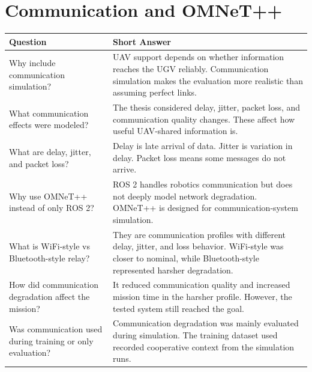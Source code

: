 \documentclass[11pt,a4paper]{article}
\begin{document}
\section*{Communication and OMNeT++}
\begin{longtable}{QA}
\toprule
\textbf{Question} & \textbf{Short Answer} \\
\midrule
\endhead
Why include communication simulation? &
UAV support depends on whether information reaches the UGV reliably. Communication simulation makes the evaluation more realistic than assuming perfect links. \\
\addlinespace
What communication effects were modeled? &
The thesis considered delay, jitter, packet loss, and communication quality changes. These affect how useful UAV-shared information is. \\
\addlinespace
What are delay, jitter, and packet loss? &
Delay is late arrival of data. Jitter is variation in delay. Packet loss means some messages do not arrive. \\
\addlinespace
Why use OMNeT++ instead of only ROS 2? &
ROS 2 handles robotics communication but does not deeply model network degradation. OMNeT++ is designed for communication-system simulation. \\
\addlinespace
What is WiFi-style vs Bluetooth-style relay? &
They are communication profiles with different delay, jitter, and loss behavior. WiFi-style was closer to nominal, while Bluetooth-style represented harsher degradation. \\
\addlinespace
How did communication degradation affect the mission? &
It reduced communication quality and increased mission time in the harsher profile. However, the tested system still reached the goal. \\
\addlinespace
Was communication used during training or only evaluation? &
Communication degradation was mainly evaluated during simulation. The training dataset used recorded cooperative context from the simulation runs. \\
\bottomrule
\end{longtable}
\end{document}
